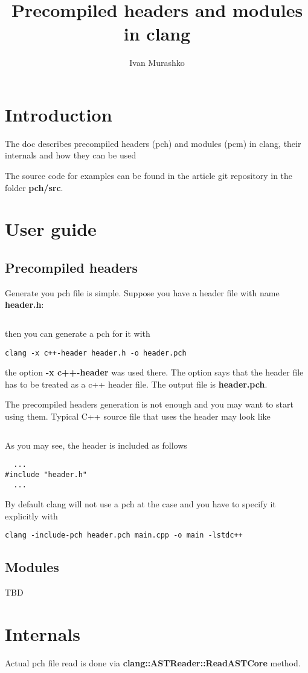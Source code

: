 \documentclass[14pt,a4paper]{article}
\title{Precompiled headers and modules in clang}
\author{Ivan Murashko}
\date{}
\begin{document}
\maketitle
\tableofcontents

\section*{Introduction}
The doc describes precompiled headers (pch) and modules (pcm) in
clang, their internals and how they can be used

The source code for examples can be found in the article git
repository \cite{github:articles_ivanmurashko} in the folder 
\textbf{pch/src}.

\section{User guide}
\subsection{Precompiled headers}
Generate you pch file is simple. Suppose you have a header file with
name \textbf{header.h}:
\inputminted{c++}{./src/simple/header.h} then you can generate a pch for it with
\begin{verbatim}
clang -x c++-header header.h -o header.pch
\end{verbatim}
the option \textbf{-x c++-header} was used there. The option says that
the header file has to be treated as a c++ header file. The output
file is \textbf{header.pch}.

The precompiled headers generation is not enough and you may want to
start using them. Typical C++ source file that uses the header may
look like
\inputminted{c++}{./src/simple/main.cpp}
As you may see, the header is included as follows
\begin{verbatim}
  ...
#include "header.h"
  ...
\end{verbatim}
By default clang will not use a pch at the case and you have to
specify it explicitly with
\begin{verbatim}
clang -include-pch header.pch main.cpp -o main -lstdc++
\end{verbatim}

\subsection{Modules}
TBD

\section{Internals}

Actual pch file read is done via
\textbf{clang::ASTReader::ReadASTCore} method.

  
     
\end{document}

